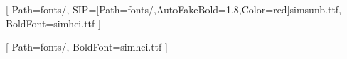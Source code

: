 
\usepackage[a4paper,margin=2cm,driver=xetex]{geometry}

\usepackage{xcolor}


[
  Path=fonts/,
  SIP={[Path=fonts/,AutoFakeBold=1.8,Color=red]simsunb.ttf},
  BoldFont=simhei.ttf
]


\setmainfont{simsun.ttc}[
  Path=fonts/,
  BoldFont=simhei.ttf
]

\usepackage[toc,lof,lot]{multitoc}    %
  \setlength{\columnseprule}{0.2pt}   %

\setcounter{secnumdepth}{3} %
\setcounter{tocdepth}{2}    %


